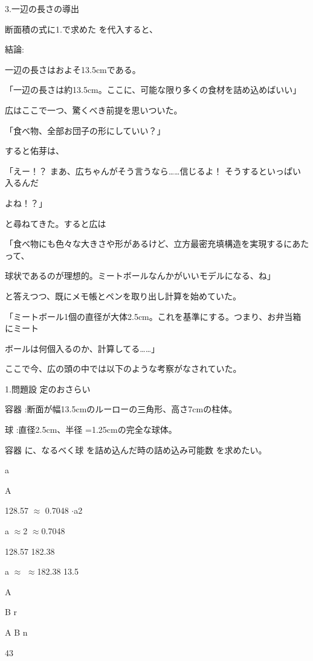 3.⼀辺の長さの導出\par
断⾯積の式に1.で求めた を代⼊すると、\par
結論:\par
⼀辺の長さはおよそ13.5cmである。\par
「⼀辺の長さは約13.5cm。ここに、可能な限り多くの⾷材を詰め込めばいい」\par
広はここで⼀つ、驚くべき前提を思いついた。\par
「⾷べ物、全部お団⼦の形にしていい？」\par
すると佑芽は、\par
「えー！？ まあ、広ちゃんがそう⾔うなら……信じるよ！ そうするといっぱい⼊るんだ\par
よね！？」\par
と尋ねてきた。すると広は\par
「⾷べ物にも⾊々な⼤きさや形があるけど、⽴⽅最密充填構造を実現するにあたって、\par
球状であるのが理想的。ミートボールなんかがいいモデルになる、ね」\par
と答えつつ、既にメモ帳とペンを取り出し計算を始めていた。\par
「ミートボール1個の直径が⼤体2.5cm。これを基準にする。つまり、お弁当箱にミート\par
ボールは何個⼊るのか、計算してる……」\par
ここで今、広の頭の中では以下のような考察がなされていた。\par
1.問題設 定のおさらい\par
容器 :断⾯が幅13.5cmのルーローの三⾓形、⾼さ7cmの柱体。\par
球 :直径2.5cm、半径 =1.25cmの完全な球体。\par
容器 に、なるべく球 を詰め込んだ時の詰め込み可能数 を求めたい。\par
a\par
A\par
128.57 $\approx$ 0.7048 $\cdot$a2\par
a $\approx$2 $\approx$0.7048\par
128.57 182.38\par
a $\approx$  $\approx$182.38 13.5\par
A\par
B r\par
A B n\par
43\par

